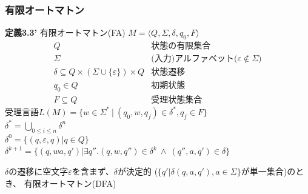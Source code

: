 \documentclass[dvipdfmx]{beamer}
\begin{document}
\begin{frame}
 \frametitle{有限オートマトン}
 \begin{screen}
  {\bf 定義3.3'} 有限オートマトン(FA)
	$M=\langle Q,\Sigma,\delta,q_0,F\rangle$
	\[
	\begin{array}{rl}
	 Q & \mbox{状態の有限集合}\\
	 \Sigma & \mbox{(入力)アルファベット($\varepsilon\notin\Sigma$)}\\
	 \delta\subseteq Q\times(\Sigma\cup\{\varepsilon\})\times Q & \mbox{状態遷移}\\
	 q_0\in Q & \mbox{初期状態}\\
	 F\subseteq Q & \mbox{受理状態集合}
	\end{array}
	\]
	受理言語$L(M)=\{w\in\Sigma^\ast\ |\ (q_0,w,q_f)\in\delta^\ast,
	q_f\in F\}$\\
	$\delta^\ast=\bigcup_{0\leq i\leq n}\delta^n$\\
	$\delta^0=\{(q,\varepsilon,q)|q\in Q\}$\\
	$\delta^{k+1}=\{(q,wa,q')|\exists q''.(q,w,q'')\in\delta^k\
	\wedge\ (q'',a,q')\in\delta\}$
 \end{screen}
 
 $\delta$の遷移に空文字$\varepsilon$を含まず、$\delta$が決定的
 ($\{q'|\delta(q,a,q'),a\in\Sigma\}$が単一集合)のとき、
 有限オートマトン(DFA)
\end{frame}
\end{document}
